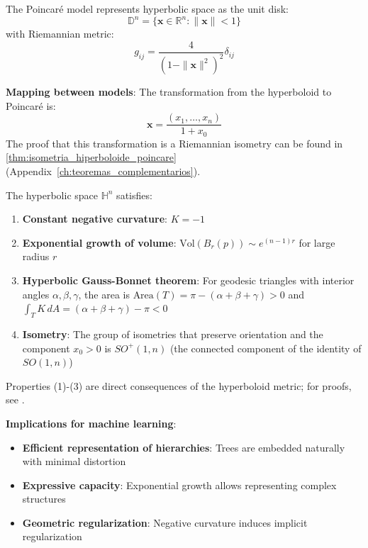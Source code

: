 \begin{definition}\label{def:modelo_poincare}
The Poincaré model represents hyperbolic space as the unit disk:
\begin{equation}
\mathbb{D}^n = \{\mathbf{x} \in \mathbb{R}^n : \|\mathbf{x}\| < 1\}
\end{equation}
with Riemannian metric:
\begin{equation}
g_{ij} = \frac{4}{(1-\|\mathbf{x}\|^2)^2} \delta_{ij}
\end{equation}

\textbf{Mapping between models}: The transformation from the hyperboloid to Poincaré is:
\begin{equation}
\mathbf{x} = \frac{(x_1, \ldots, x_n)}{1 + x_0}
\end{equation}
The proof that this transformation is a Riemannian isometry can be found in \autoref{thm:isometria_hiperboloide_poincare} (Appendix~\ref{ch:teoremas_complementarios}).
\end{definition}

\begin{theorem}\label{thm:propiedades_espacio_hiperbolico}
The hyperbolic space $\mathbb{H}^n$ satisfies:
\begin{enumerate}
    \item \textbf{Constant negative curvature}: $K = -1$
    \item \textbf{Exponential growth of volume}: $\text{Vol}(B_r(p)) \sim e^{(n-1)r}$ for large radius $r$
    \item \textbf{Hyperbolic Gauss-Bonnet theorem}: For geodesic triangles with interior angles $\alpha, \beta, \gamma$, the area is $\text{Area}(T) = \pi - (\alpha + \beta + \gamma) > 0$ and $\int_T K\, dA = (\alpha + \beta + \gamma) - \pi < 0$
    \item \textbf{Isometry}: The group of isometries that preserve orientation and the component $x_0 > 0$ is $SO^+(1,n)$ (the connected component of the identity of $SO(1,n)$)
\end{enumerate}
Properties (1)-(3) are direct consequences of the hyperboloid metric; for proofs, see \citep{do1976differential}.
\end{theorem}

\textbf{Implications for machine learning}:
\begin{itemize}
    \item \textbf{Efficient representation of hierarchies}: Trees are embedded naturally with minimal distortion
    \item \textbf{Expressive capacity}: Exponential growth allows representing complex structures
    \item \textbf{Geometric regularization}: Negative curvature induces implicit regularization
\end{itemize}

